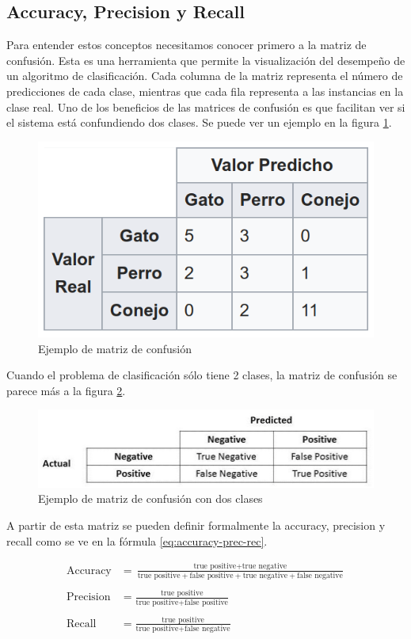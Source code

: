\subsection{Accuracy, Precision y Recall}

Para entender estos conceptos necesitamos conocer primero a la matriz de confusión. Esta es una herramienta que permite la visualización del desempeño de un algoritmo de clasificación. Cada columna de la matriz representa el número de predicciones de cada clase, mientras que cada fila representa a las instancias en la clase real. Uno de los beneficios de las matrices de confusión es que facilitan ver si el sistema está confundiendo dos clases. Se puede ver un ejemplo en la figura \ref{fig:confussion}.

\begin{figure}
    \centering
    \caption{Ejemplo de matriz de confusión}
    \label{fig:confussion}
    \includegraphics[width=0.5\linewidth]{graficos/confussion_matrix.png}
\end{figure}

Cuando el problema de clasificación sólo tiene 2 clases, la matriz de confusión se parece más a la figura \ref{fig:confussion2}.

\begin{figure}
    \centering
    \caption{Ejemplo de matriz de confusión con dos clases}
    \label{fig:confussion2}
    \includegraphics[width=0.8\linewidth]{graficos/confussion_matrix_2.png}
\end{figure}

A partir de esta matriz se pueden definir formalmente la accuracy, precision y recall como se ve en la fórmula \ref{eq:accuracy-prec-rec}.

\begin{equation}
    \label{eq:accuracy-prec-rec}
\begin{split}
    \text{Accuracy}  &= \frac{\text{true positive} + \text{true negative}}{\text{true positive} + \text{false positive} + \text{true negative} + \text{false negative}} \\\\
    \text{Precision} &= \frac{\text{true positive}}{\text{true positive} + \text{false positive}} \\\\
    \text{Recall}    &= \frac{\text{true positive}}{\text{true positive} + \text{false negative}} 
\end{split}
\end{equation}

